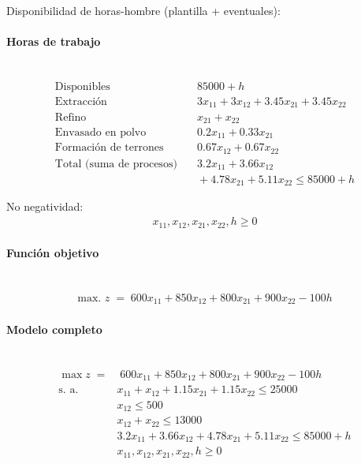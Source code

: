 Disponibilidad de horas-hombre (plantilla + eventuales):  
\paragraph{Horas de trabajo}\mbox{}\\

\begin{align}
\text{Disponibles} & \quad 85000 + h \\[6pt]
\text{Extracción}  & \quad 3x_{11} + 3x_{12} + 3.45x_{21} + 3.45x_{22} \\[6pt]
\text{Refino}      & \quad x_{21} + x_{22} \\[6pt]
\text{Envasado en polvo} & \quad 0.2x_{11} + 0.33x_{21} \\[6pt]
\text{Formación de terrones} & \quad 0.67x_{12} + 0.67x_{22} \\[10pt]
\text{Total (suma de procesos)} & \quad 3.2x_{11} + 3.66x_{12} \\
                                & \quad + 4.78x_{21} + 5.11x_{22} \le 85000 + h
\end{align}




No negatividad:  
\begin{align}
x_{11}, x_{12}, x_{21}, x_{22}, h \geq 0 
\end{align}

\paragraph{Función objetivo}\mbox{}\\

\begin{align}
\mbox{max. } z \;=\; 600x_{11} + 850x_{12} + 800x_{21} + 900x_{22} - 100h
\end{align}

\paragraph{Modelo completo}\mbox{}\\


\begin{align}
\max z \;=&\; 600x_{11} + 850x_{12} + 800x_{21} + 900x_{22} - 100h \\
\text{s. a.} \quad
& x_{11} + x_{12} + 1.15x_{21} + 1.15x_{22} \leq 25000 \\
& x_{12} \leq 500 \\
& x_{12} + x_{22} \leq 13000 \\
& 3.2x_{11} + 3.66x_{12} + 4.78x_{21} + 5.11x_{22} \leq 85000 + h \\
& x_{11}, x_{12}, x_{21}, x_{22}, h \geq 0
\end{align}




